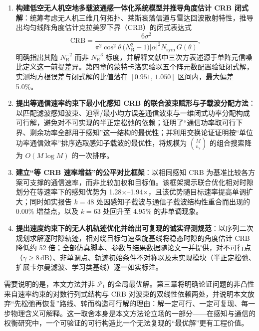 \begin{enumerate}
  \item \textbf{构建低空无人机空地多载波通感一体化系统模型并推导角度估计 CRB 闭式解}：统筹考虑无人机三维几何拓扑、莱斯衰落信道与雷达回波散射特性，推导出均匀线阵角度估计克拉美罗下界（CRB）的闭式表达式
  \begin{equation}
    \mathrm{CRB} = \frac{6\sigma^{2}}{\pi^{2}\cos^{2}\theta\,\bigl(N_{\mathrm{R}}^{2}-1\bigr)\lvert\alpha\rvert^{2}N_{\mathrm{sym}}\,G(\theta)},
    \label{eq:intro_crb}
  \end{equation}
  明确指出其随 $N_{\mathrm{R}}^{-2}$ 而非 $N_{\mathrm{R}}^{-3}$ 标度，并解释文献中三次方表述源于单阵元信噪比定义这一前提差异。第四章的蒙特卡洛实验以五个阵元数配置验证闭式解，实测均方根误差与闭式解的比值落在 $[0.951,\,1.050]$ 区间内，最大偏差 5.0\%。

  \item \textbf{提出等通信速率约束下最小化感知 CRB 的联合波束赋形与子载波分配方法}：以匹配滤波感知波束、迫零/最小均方误差通信波束与一维闭式功率分配构成可行解，避免对不可实现的半正定松弛的依赖；证明了“通信功率取可行下界、剩余功率全部用于感知”这一结构的最优性；并利用交换论证证明按“单位功率通信效率”排序选取感知子载波的最优性，将规模为 $\binom{M}{n_s}$ 的组合搜索降为 $O(M\log M)$ 的一次排序。

  \item \textbf{建立“等 CRB 速率增益”的公平对比框架}：以相同感知 CRB 为基准比较各方案可支撑的通信速率，而非比较加权和目标值。该框架揭示联合优化相对时隙划分在等速率下的感知优势为 1.28$\times$–1.94$\times$，且该优势随目标速率提高单调扩大；同时如实报告 $k=48$ 处因感知子载波与通信子载波结构性重合而出现的 0.00\% 增益点，以及 $k=63$ 处回升至 4.95\% 的非单调现象。

  \item \textbf{提出速度约束下的无人机轨迹优化并给出可复现的诚实评测规范}：以序列二次规划求解逐时隙轨迹，相对绕目标匀速盘旋基线将稳态时隙的角度估计 CRB 降低约 52 倍；全部仿真脚本、参数与结果数据随论文一并提供，对不可行点（$\gamma\ge 8$\,dB）、非单调点、轨迹初始条件不对称以及未实现模块（半正定松弛、扩展卡尔曼滤波、学习类基线）逐一如实标注。
\end{enumerate}

需要说明的是，本文方法并非 $\mathcal{P}_{1}$ 的全局最优解。第三章将明确论证问题的非凸性来自速率约束的对数行列式结构与 CRB 对波束的双线性依赖两处，并说明本文放弃“先松弛再恢复”路线、转而构造可行解的理由：解一定可行、一定可复现、每一步物理含义可解释。这一取舍本身是本文方法论立场的一部分——在感知与通信的权衡研究中，一个可验证的可行构造比一个无法复现的“最优解”更有工程价值。

